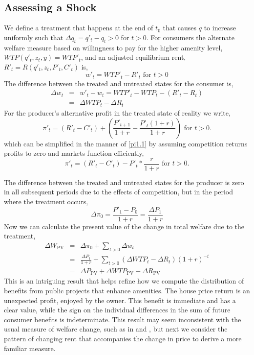 \documentclass[ecta,nameyear,draft]{econsocart}
\theoremstyle{plain}
\theoremstyle{remark}
\begin{document}
\subsection{Assessing a Shock}
We define a treatment that happens at the end of $t_0$ that causes $q$ to increase uniformly such that $\Delta q_t=q'_t-q_t>0$ for $t>0$.
For consumers the alternate welfare measure based on willingness to pay for the higher amenity level,$\mathit{WTP}(q'_t,z_t,y)=\mathit{WTP'}_t$, and an adjusted equilibrium rent, $R'_t=R(q'_t,z_t,P'_t,C'_t)$ is,
\begin{equation*}
	w'_t=\mathit{WTP'}_t-R'_t \text{ for } t>0
\end{equation*}
The difference between the treated and untreated states for the consumer is,
\begin{eqnarray}
	\Delta w_t&=&w'_t-w_t=WTP'_t-WTP_t-(R'_t-R_t)\\
	&=&\Delta\mathit{WTP}_t-\Delta R_t
\end{eqnarray}
For the producer’s alternative profit in the treated state of reality we write,
\begin{equation*}
	\pi'_t = (R'_t-C'_t)+\left(\frac{P'_{t+1}}{1+r}-\frac{P'_t(1+r)}{1+r}\right)\text{ for } t>0.
\end{equation*}
which can be simplified in the manner of \ref{pi1.1} by assuming competition returns profits to zero and markets function efficiently,
\begin{equation}
\pi'_t = (R'_t-C'_t)-P'_t*\frac{r}{1+r}\text{ for } t>0.\label{pi2}
\end{equation}

The difference between the treated and untreated states for the producer is zero in all subsequent periods due to the effects of competition, but in the period where the treatment occurs,
\begin{equation}
	\Delta\pi_0=\frac{P'_1-P_0}{1+r}=\frac{\Delta P_1}{1+r}\label{pitzero}
\end{equation}
Now we can calculate the present value of the change in total welfare due to the treatment,
\begin{eqnarray}
	\Delta W_{\mathrm{PV}}&=&\Delta \pi_0+\sum_{t>0}\Delta w_t\nonumber\\
	&=&\frac{\Delta P_1}{1+r}+\sum_{t>0} (\Delta \mathit{WTP}_t-\Delta R_t)(1+r)^{-t} \label{deltaW1}\\
	&=&\Delta P_{\mathrm{PV}}+\Delta\mathit{WTP}_\mathrm{PV}-\Delta R_{\mathrm{PV}}\label{deltaW2}
\end{eqnarray}
This is an intriguing result that helps refine how we compute the distribution of benefits from public projects that enhance amenities. The house price return is an unexpected profit, enjoyed by the owner. This benefit is immediate and has a clear value, while the sign on the individual differences in the sum of future consumer benefits is indeterminate. This result may seem inconsistent with the usual measure of welfare change, such as in \cite{freeman14} and \cite{banzhaf20}, but next we consider the pattern of changing rent that accompanies the change in price to derive a more familiar measure. 
\end{document}

